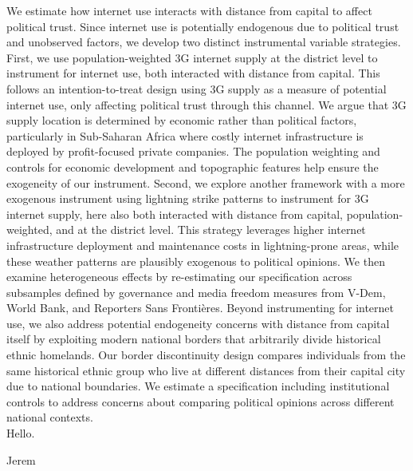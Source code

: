 \documentclass[11pt]{article}
\begin{document}
We estimate how internet use interacts with distance from capital to affect political trust.
Since internet use is potentially endogenous due to political trust and unobserved factors, we develop two distinct instrumental variable strategies.
First, we use population-weighted 3G internet supply at the district level to instrument for internet use, both interacted with distance from capital.
This follows an intention-to-treat design using 3G supply as a measure of potential internet use, only affecting political trust through this channel.
We argue that 3G supply location is determined by economic rather than political factors, particularly in Sub-Saharan Africa where costly internet infrastructure is deployed by profit-focused private companies.
The population weighting and controls for economic development and topographic features help ensure the exogeneity of our instrument.
Second, we explore another framework with a more exogenous instrument using lightning strike patterns to instrument for 3G internet supply, here also both interacted with distance from capital, population-weighted, and at the district level.
This strategy leverages higher internet infrastructure deployment and maintenance costs in lightning-prone areas, while these weather patterns are plausibly exogenous to political opinions.
We then examine heterogeneous effects by re-estimating our specification across subsamples defined by governance and media freedom measures from V-Dem, World Bank, and Reporters Sans Frontières.
Beyond instrumenting for internet use, we also address potential endogeneity concerns with distance from capital itself by exploiting modern national borders that arbitrarily divide historical ethnic homelands.
Our border discontinuity design compares individuals from the same historical ethnic group who live at different distances from their capital city due to national boundaries.
We estimate a specification including institutional controls to address concerns about comparing political opinions across different national contexts.\\

Hello.

Jerem
\end{document}
